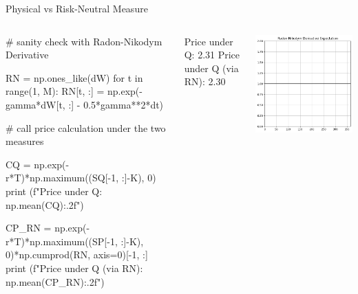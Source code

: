 \documentclass{beamer}
\begin{document}
\begin{frame}[fragile]{Physical vs Risk-Neutral Measure}
\begin{columns}
\begin{ipython}
# sanity check with Radon-Nikodym Derivative

RN = np.ones_like(dW)
for t in range(1, M):
    RN[t, :] = np.exp(-gamma*dW[t, :] - 0.5*gamma**2*dt)



# call price calculation under the two measures

CQ = np.exp(-r*T)*np.maximum((SQ[-1, :]-K), 0)
print (f"Price under Q: {np.mean(CQ):.2f}")
	
CP_RN = np.exp(-r*T)*np.maximum((SP[-1, :]-K), 0)*np.cumprod(RN, axis=0)[-1, :]
print (f"Price under Q (via RN): {np.mean(CP_RN):.2f}")		
\end{ipython}
\begin{ioutput}
	
Price under Q: 2.31
Price under Q (via RN): 2.30
\end{ioutput}
\includegraphics[width=0.80\linewidth]{images/rdn_physical_risk_neutral}
\vspace{1.6cm}
\end{columns}	
\end{frame}
\end{document}
